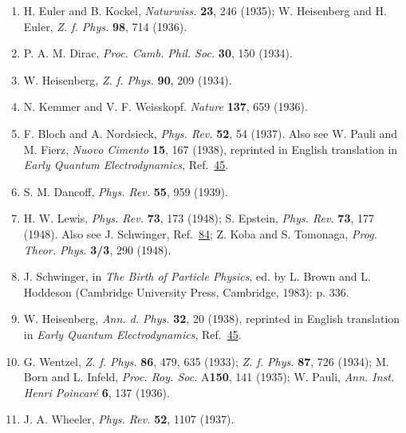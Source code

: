 \begin{enumerate}
\item\label{ref:1.65} H. Euler and B. Kockel, \emph{Naturwiss.} \textbf{23}, 246 (1935); W.
Heisenberg and H. Euler, \emph{Z. f. Phys.} \textbf{98}, 714 (1936).

\item\label{ref:1.66} P. A. M. Dirac, \emph{Proc. Camb. Phil. Soc.} \textbf{30}, 150 (1934).

\item\label{ref:1.67} W. Heisenberg, \emph{Z. f. Phys.} \textbf{90}, 209 (1934).

\item\label{ref:1.68} N. Kemmer and V. F. Weisskopf. \emph{Nature} \textbf{137}, 659 (1936).

\item[68a.]\label{ref:1.68a} F. Bloch and A. Nordsieck, \emph{Phys. Rev.} \textbf{52}, 54
(1937). Also see W. Pauli and M. Fierz, \emph{Nuovo Cimento} \textbf{15}, 167
(1938), reprinted in English translation in \emph{Early Quantum
Electrodynamics}, Ref.~\hyperref[ref:1.45]{45}.

\item\label{ref:1.69} S. M. Dancoff, \emph{Phys. Rev.} \textbf{55}, 959 (1939).

\item[69a.]\label{ref:1.69a} H. W. Lewis, \emph{Phys. Rev.} \textbf{73}, 173 (1948); S.
Epstein, \emph{Phys. Rev.} \textbf{73}, 177 (1948). Also see J. Schwinger,
Ref.~\hyperref[ref:1.84]{84}; Z. Koba and S. Tomonaga, \emph{Prog. Theor. Phys.} \textbf{3/3}, 290
(1948).

\item[69b.]\label{ref:1.69b} J. Schwinger, in \emph{The Birth of Particle Physics}, ed. by L.
Brown and L. Hoddeson (Cambridge University Press, Cambridge, 1983): p. 336.

\item\label{ref:1.70} W. Heisenberg, \emph{Ann. d. Phys.} \textbf{32}, 20 (1938), reprinted
in English translation in \emph{Early Quantum Electrodynamics}, Ref.~\hyperref[ref:1.45]{45}.

\item[70a.]\label{ref:1.70a} G. Wentzel, \emph{Z. f. Phys.} \textbf{86}, 479, 635 (1933);
\emph{Z. f. Phys.} \textbf{87}, 726 (1934); M. Born and L. Infeld, \emph{Proc.
Roy. Soc.} A\textbf{150}, 141 (1935); W. Pauli, \emph{Ann. Inst. Henri
Poincar\'e} \textbf{6}, 137 (1936).

\item\label{ref:1.71} J. A. Wheeler, \emph{Phys. Rev.} \textbf{52}, 1107 (1937).


\end{enumerate}

